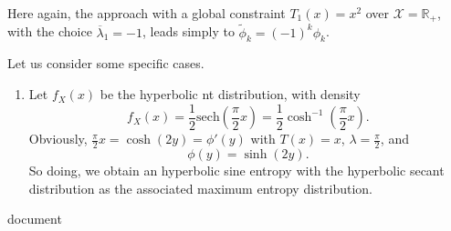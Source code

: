 \documentclass[english]{elsarticle}
\theoremstyle{definition}
\theoremstyle{plain}
\theoremstyle{plain}
\def\Rset{\mathbb{R}}
\def\X{\mathcal{X}}
\begin{document}
Here again, the approach with a global constraint $T_{1}(x)=x^{2}$
over $\X=\Rset_{+}$, with the choice $\overline{\lambda}_{1}=-1$,
leads simply to $\widetilde{\phi}_{k}=(-1)^{k}\phi_{k}$. %




\vspace{1cm}


\centerline{\underline{\hspace{10cm}}}

\vspace{1cm}






Let us consider some specific cases. 
\begin{enumerate}
\item Let $f_{X}(x)$ be the hyperbolic nt distribution, with density 
\[
f_{X}(x)=\frac{1}{2}\text{sech}(\frac{\pi}{2}x)=\frac{1}{2}\cosh^{-1}(\frac{\pi}{2}x).
\]
Obviously, $\frac{\pi}{2}x=\cosh(2y)=\phi'(y)$ with $T(x)=x$, $\lambda=\frac{\pi}{2}$,
and 
\[
\phi(y)=\sinh(2y).
\]
So doing, we obtain an hyperbolic sine entropy with the hyperbolic
secant distribution as the associated maximum entropy distribution. 
\end{enumerate}
{document} 
\end{document}
